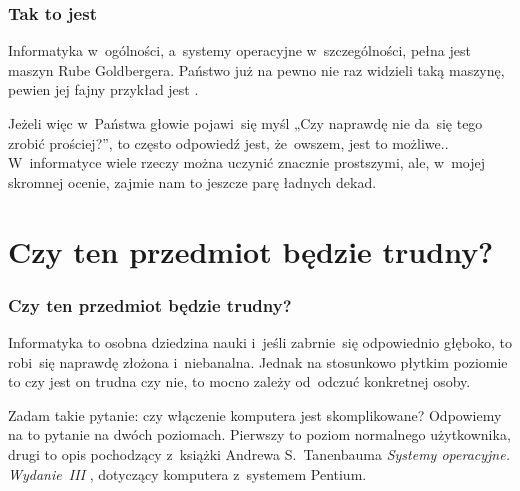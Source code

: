 \documentclass[10pt,t]{beamer}
\begin{document}
\begin{frame}
  \frametitle{Tak to jest}


  Informatyka w~ogólności, a~systemy operacyjne w~szczególności, pełna jest
  maszyn Rube Goldbergera. Państwo już na pewno nie raz widzieli taką
  maszynę, pewien jej fajny przykład jest
  .

  Jeżeli więc w~Państwa głowie pojawi~się myśl „Czy naprawdę nie da~się
  tego zrobić prościej?”, to często odpowiedź jest, że~owszem, jest to
  możliwe.. W~informatyce wiele rzeczy można uczynić znacznie prostszymi,
  ale, w~mojej skromnej ocenie, zajmie nam to jeszcze parę ładnych dekad.

\end{frame}



















\section{Czy ten przedmiot będzie trudny?}



\begin{frame}
  \frametitle{Czy ten przedmiot będzie trudny?}


  Informatyka to osobna dziedzina nauki i~jeśli zabrnie~się odpowiednio
  głęboko, to robi~się naprawdę złożona i~niebanalna. Jednak na stosunkowo
  płytkim poziomie to czy jest on trudna czy nie, to mocno zależy od~odczuć
  konkretnej osoby.

  Zadam takie pytanie: czy włączenie komputera jest skomplikowane?
  Odpowiemy na to pytanie na dwóch poziomach. Pierwszy to poziom normalnego
  użytkownika, drugi to opis pochodzący z~książki Andrewa S.~Tanenbauma
  \textit{Systemy operacyjne. Wydanie~III}
  \parencite{Tannenbaum-Systemy-Operacyjne-Wydanie-III-Pub-2013}, dotyczący
  komputera z~systemem Pentium.

\end{frame}
\end{document}
